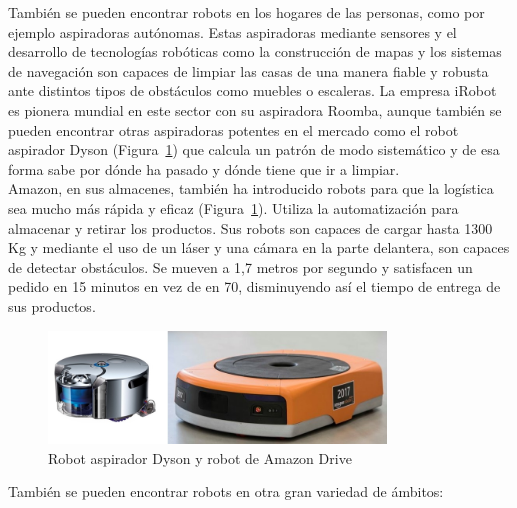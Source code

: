 También se pueden encontrar robots en los hogares de las personas, como por ejemplo aspiradoras autónomas. Estas aspiradoras mediante sensores y el desarrollo de tecnologías robóticas como la construcción de mapas y los sistemas de navegación son capaces de limpiar las casas de una manera fiable y robusta ante distintos tipos de obstáculos como muebles o escaleras. La empresa iRobot es pionera mundial en este sector con su aspiradora Roomba, aunque también se pueden encontrar otras aspiradoras potentes en el mercado como el robot aspirador Dyson (Figura~\ref{fig.dyson_amazon}) que calcula un patrón de modo sistemático y de esa forma sabe por dónde ha pasado y dónde tiene que ir a limpiar.\\

Amazon, en sus almacenes, también ha introducido robots para que la logística sea mucho más rápida y eficaz (Figura~\ref{fig.dyson_amazon}). Utiliza la automatización para almacenar y retirar los productos. Sus robots son capaces de cargar hasta 1300 Kg y mediante el uso de un láser y una cámara en la parte delantera, son capaces de detectar obstáculos. Se mueven a 1,7 metros por segundo y satisfacen un pedido en 15 minutos en vez de en 70, disminuyendo así el tiempo de entrega de sus productos.

\begin{figure}[H]
  \begin{center}
    \includegraphics[width=0.8\textwidth]{figures/Introduccion/dyson_amazon.jpg}
		\caption{Robot aspirador Dyson y robot de Amazon Drive}
		\label{fig.dyson_amazon}
		\end{center}
\end{figure}

También se pueden encontrar robots en otra gran variedad de ámbitos:
	
